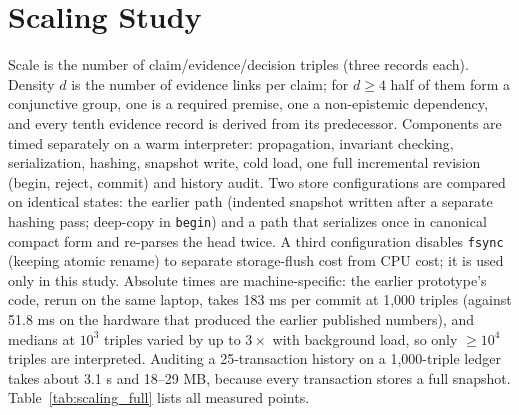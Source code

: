 \documentclass[journal]{IEEEtran}
\begin{document}
\section{Scaling Study}
Scale is the number of claim/evidence/decision triples (three records each). Density $d$ is the number of evidence links per claim; for $d\ge4$ half of them form a conjunctive group, one is a required premise, one a non-epistemic dependency, and every tenth evidence record is derived from its predecessor. Components are timed separately on a warm interpreter: propagation, invariant checking, serialization, hashing, snapshot write, cold load, one full incremental revision (begin, reject, commit) and history audit. Two store configurations are compared on identical states: the earlier path (indented snapshot written after a separate hashing pass; deep-copy in \texttt{begin}) and a path that serializes once in canonical compact form and re-parses the head twice. A third configuration disables \texttt{fsync} (keeping atomic rename) to separate storage-flush cost from CPU cost; it is used only in this study. Absolute times are machine-specific: the earlier prototype's code, rerun on the same laptop, takes 183 ms per commit at 1,000 triples (against 51.8 ms on the hardware that produced the earlier published numbers), and medians at $10^3$ triples varied by up to $3\times$ with background load, so only $\ge10^4$ triples are interpreted. Auditing a 25-transaction history on a 1,000-triple ledger takes about 3.1 s and 18--29 MB, because every transaction stores a full snapshot. Table~\ref{tab:scaling_full} lists all measured points.
\end{document}
